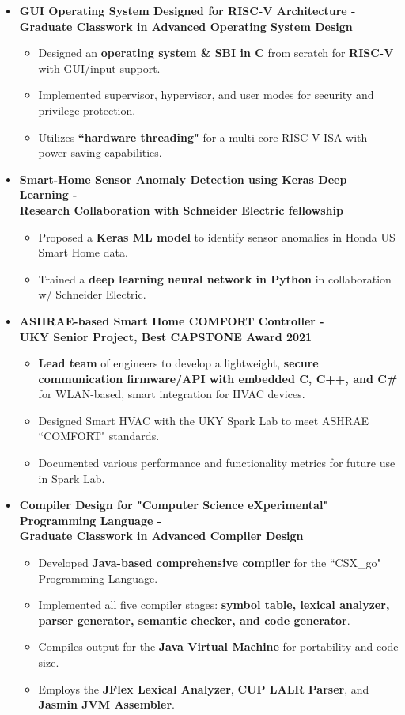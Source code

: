 \documentclass[line,margin,9pt]{res}
\begin{document}
\begin{resume}
\begin{itemize}
\item \textbf{GUI Operating System Designed for RISC-V Architecture - \\
	\small{Graduate Classwork in Advanced Operating System Design}} 
\begin{itemize}
\item Designed an \textbf{operating system \& SBI in C} from scratch for \textbf{RISC-V} with GUI/input support.
\item Implemented supervisor, hypervisor, and user modes for security and privilege protection.
\item Utilizes \textbf{``hardware threading"} for a multi-core RISC-V ISA with power saving capabilities.
\end{itemize}

\item \textbf{Smart-Home Sensor Anomaly Detection using Keras Deep Learning - \\
	\small{Research Collaboration with Schneider Electric fellowship}}  
\begin{itemize}
\item Proposed a \textbf{Keras ML model} to identify sensor anomalies in Honda US Smart Home data.
\item Trained a \textbf{deep learning neural network in Python} in collaboration w/ Schneider Electric.
\end{itemize}

\item \textbf{ASHRAE-based Smart Home COMFORT Controller - \\
	\small{UKY Senior Project, Best CAPSTONE Award 2021}}
\begin{itemize}
\item \textbf{Lead team} of engineers to develop a lightweight, \textbf{secure communication firmware/API with embedded C, C++, and C\#} for WLAN-based, smart integration for HVAC devices.
\item Designed Smart HVAC with the UKY Spark Lab to meet ASHRAE ``COMFORT" standards.
\item Documented various performance and functionality metrics for future use in Spark Lab.
\end{itemize}

\item \textbf{Compiler Design for "Computer Science eXperimental" Programming Language - \\
	\small{Graduate Classwork in Advanced Compiler Design}} 
\begin{itemize}
\item Developed \textbf{Java-based comprehensive compiler} for the ``CSX\_go" Programming Language.
\item Implemented all five compiler stages: \textbf{symbol table, lexical analyzer, parser generator, semantic checker, and code generator}.
\item Compiles output for the \textbf{Java Virtual Machine} for portability and code size.
\item Employs the \textbf{JFlex Lexical Analyzer}, \textbf{CUP LALR Parser}, and \textbf{Jasmin JVM Assembler}.
\end{itemize}


\end{itemize}
\end{resume}
\end{document}
